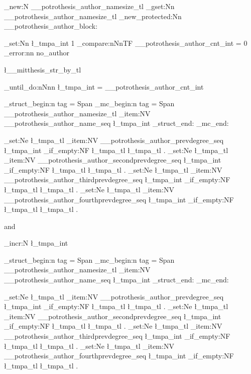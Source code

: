 \tl_new:N   \g__potrothesis_author_namesize_tl
\tl_gset:Nn \g__potrothesis_author_namesize_tl { \large }
\cs_new_protected:Nn  \__potrothesis_author_block: {
	\int_set:Nn \l_tmpa_int {1} %
	\int_compare:nNnTF { \g__potrothesis_author_cnt_int } = {0} {
		\msg_error:nn { \ClassName } { no_author }
	}	
	{\l__mitthesis_str_by_tl\par
	\int_until_do:nNnn { \l_tmpa_int } = { \g__potrothesis_author_cnt_int } {
		{ 
			\leavevmode
			\tag_struct_begin:n { tag = Span }
	    	\tag_mc_begin:n { tag = Span }
			\g__potrothesis_author_namesize_tl \seq_item:NV \g__potrothesis_author_name_seq \l_tmpa_int
			\tag_struct_end:
    		\tag_mc_end:
		} \par
		\tl_set:Ne \l_tmpa_tl { \seq_item:NV \g__potrothesis_author_prevdegree_seq \l_tmpa_int }
		\tl_if_empty:NF \l_tmpa_tl { \normalsize \l_tmpa_tl . } %
		\tl_set:Ne \l_tmpa_tl { \seq_item:NV \g__potrothesis_author_secondprevdegree_seq \l_tmpa_int } 
		\tl_if_empty:NF \l_tmpa_tl { \linebreak\normalsize \l_tmpa_tl . }
		\tl_set:Ne \l_tmpa_tl { \seq_item:NV \g__potrothesis_author_thirdprevdegree_seq \l_tmpa_int } 
		\tl_if_empty:NF \l_tmpa_tl { \linebreak\normalsize \l_tmpa_tl . }
		\tl_set:Ne \l_tmpa_tl { \seq_item:NV \g__potrothesis_author_fourthprevdegree_seq \l_tmpa_int } 
		\tl_if_empty:NF \l_tmpa_tl { \linebreak\normalsize \l_tmpa_tl . }
		\par and\par
		\int_incr:N \l_tmpa_int
	}
		{ 
			\leavevmode
			\tag_struct_begin:n { tag = Span }
	    	\tag_mc_begin:n { tag = Span }
			\g__potrothesis_author_namesize_tl \seq_item:NV \g__potrothesis_author_name_seq \l_tmpa_int 
			\tag_struct_end:
    		\tag_mc_end:
		} \par
		\tl_set:Ne \l_tmpa_tl { \seq_item:NV \g__potrothesis_author_prevdegree_seq \l_tmpa_int }
		\tl_if_empty:NF \l_tmpa_tl { \normalsize \l_tmpa_tl . } %
		\tl_set:Ne \l_tmpa_tl { \seq_item:NV \g__potrothesis_author_secondprevdegree_seq \l_tmpa_int } 
		\tl_if_empty:NF \l_tmpa_tl { \linebreak\normalsize \l_tmpa_tl . }
		\tl_set:Ne \l_tmpa_tl { \seq_item:NV \g__potrothesis_author_thirdprevdegree_seq \l_tmpa_int } 
		\tl_if_empty:NF \l_tmpa_tl { \linebreak\normalsize \l_tmpa_tl . }
		\tl_set:Ne \l_tmpa_tl { \seq_item:NV \g__potrothesis_author_fourthprevdegree_seq \l_tmpa_int } 
		\tl_if_empty:NF \l_tmpa_tl { \linebreak\normalsize \l_tmpa_tl . }
    	\par 
    }
}
\NewDocumentCommand{}

